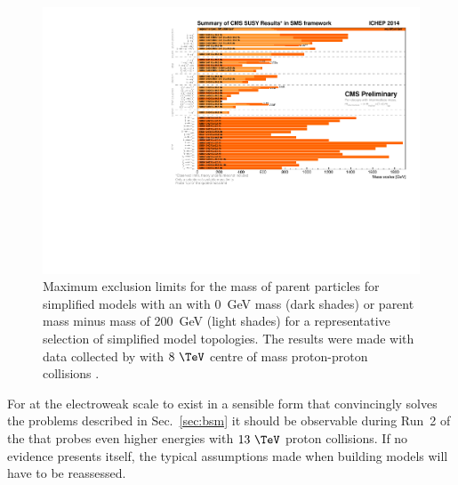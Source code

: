 \begin{figure}
  \includegraphics[width=1.0\linewidth]{figs/run1SusyExclusion}
  \caption[]%
  {Maximum exclusion limits for the mass of \SUSY parent particles for
  simplified models with an \LSP with 0~GeV mass (dark shades) or
  parent mass minus \LSP mass of 200~GeV (light shades) for a
  representative selection of simplified model topologies. The results
  were made with data collected by \CMS with $8~\tev$ centre of mass
  proton-proton collisions \cite{smsTwiki}.}%
  \label{fig:run1Exclusion}
\end{figure}


For \SUSY at the electroweak scale to exist in a sensible form that
convincingly solves the problems described in Sec.~\ref{sec:bsm} it
should be observable during Run~2 of the \LHC that probes even higher
energies with $13~\tev$ proton collisions. If no evidence presents
itself, the typical assumptions made when building \SUSY models will
have to be reassessed.

